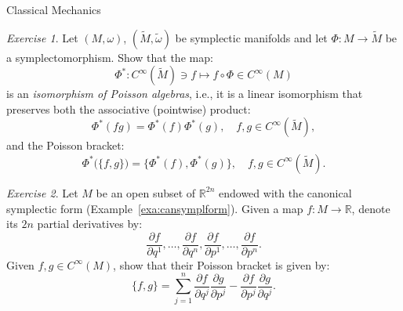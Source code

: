 \documentclass[oneside,a4paper,11pt]{amsbook}
\newcommand{\R}{\mathds R}
\theoremstyle{remark}\newtheorem{exercise}{Exercise}[chapter]
\theoremstyle{plain}\newtheorem{teo}{Theorem}[section]
\theoremstyle{plain}\newtheorem{lem}[teo]{Lemma}
\theoremstyle{plain}\newtheorem{prop}[teo]{Proposition}
\theoremstyle{plain}\newtheorem{cor}[teo]{Corollary}
\theoremstyle{definition}\newtheorem{defin}[teo]{Definition}
\theoremstyle{remark}\newtheorem{rem}[teo]{Remark}
\theoremstyle{definition}\newtheorem{notation}[teo]{Notation}
\theoremstyle{definition}\newtheorem{convention}[teo]{Convention}
\theoremstyle{definition}\newtheorem{example}[teo]{Example}
\numberwithin{section}{chapter}
\numberwithin{equation}{section}
\begin{document}
\begin{chapter}{Classical Mechanics}
\begin{exercise}
Let $(M,\omega)$, $(\widetilde M,\tilde\omega)$ be symplectic manifolds and let $\Phi:M\to\widetilde M$ be a symplectomorphism. Show that the map:
\[\Phi^*:C^\infty(\widetilde M)\ni f\longmapsto f\circ\Phi\in C^\infty(M)\]
is an {\em isomorphism of Poisson algebras}, i.e., it is a linear isomorphism that preserves both the associative (pointwise) product:
\[\Phi^*(fg)=\Phi^*(f)\Phi^*(g),\quad f,g\in C^\infty(\widetilde M),\]
and the Poisson bracket:
\[\Phi^*\big(\{f,g\}\big)=\{\Phi^*(f),\Phi^*(g)\},\quad f,g\in C^\infty(\widetilde M).\]
\end{exercise}

\begin{exercise}
Let $M$ be an open subset of $\R^{2n}$ endowed with the canonical symplectic form (Example~\ref{exa:cansymplform}). Given a map
$f:M\to\R$, denote its $2n$ partial derivatives by:
\[\frac{\partial f}{\partial q^1},\ldots,\frac{\partial f}{\partial q^n},\frac{\partial f}{\partial p^1},\ldots,\frac{\partial f}{\partial p^n}.\]
Given $f,g\in C^\infty(M)$, show that their Poisson bracket is given by:
\[\{f,g\}=\sum_{j=1}^n\frac{\partial f}{\partial q^j}\frac{\partial g}{\partial p^j}-\frac{\partial f}{\partial p^j}\frac{\partial g}{\partial q^j}.\]
\end{exercise}


\end{chapter}
\end{document}
